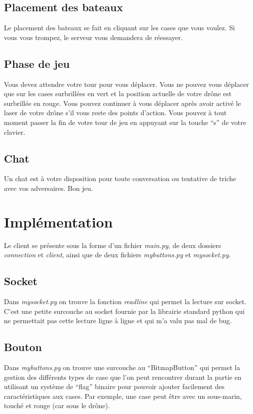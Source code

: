 \documentclass[a4paper, 11pt]{report}
\begin{document}
\subsection{Placement des bateaux}
Le placement des bateaux se fait en cliquant sur les cases que vous voulez. Si vous vous trompez, le serveur vous demandera de réessayer.

\subsection{Phase de jeu}
Vous devez attendre votre tour pour vous déplacer. Vous ne pouvez vous déplacer que sur les cases surbrillées en vert et la position
actuelle de votre drône est surbrillée en rouge. Vous pouvez continuer à vous déplacer après avoir activé le laser de votre drône s'il vous reste des points d'action.
Vous pouvez à tout moment passer la fin de votre tour de jeu en appuyant sur la touche ``s'' de votre clavier.

\subsection{Chat}
Un chat est à votre disposition pour toute conversation ou tentative de triche avec vos adversaires.
\newline
\newline
Bon jeu.

\section{Implémentation}

Le client se présente sous la forme d'un fichier \emph{main.py}, de deux dossiers
\emph{connection} et \emph{client}, ainsi que de deux fichiers
\emph{mybuttons.py} et \emph{mysocket.py}.

\subsection{Socket}
Dans \emph{mysocket.py} on trouve la fonction \emph{readline}
qui permet la lecture sur socket. C'est une petite surcouche au socket fournie par la librairie standard python qui ne permettait pas cette
lecture ligne à ligne et qui m'a valu pas mal de bug.

\subsection{Bouton}
Dans \emph{mybuttons.py} on trouve une surcouche au ``BitmapButton'' qui permet la gestion des différents types de
case que l'on peut rencontrer durant la partie en utilisant un système de ``flag'' binaire pour pouvoir ajouter facilement des caractéristiques aux cases.
Par exemple, une case peut être avec un sous-marin, touché et rouge (car sous le drône).
\end{document}

